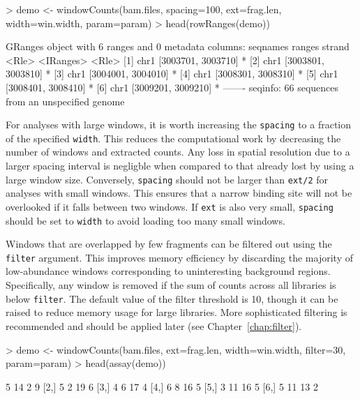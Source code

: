 \documentclass[12pt]{report}
\renewenvironment{Schunk}{\vspace{0pt}}{\vspace{0pt}}
\newcommand{\code}[1]{{\small\texttt{#1}}}
\begin{document}
\begin{Schunk}
\begin{Sinput}
> demo <- windowCounts(bam.files, spacing=100, ext=frag.len, width=win.width, param=param)
> head(rowRanges(demo))
\end{Sinput}
\begin{Soutput}
GRanges object with 6 ranges and 0 metadata columns:
      seqnames             ranges strand
         <Rle>          <IRanges>  <Rle>
  [1]     chr1 [3003701, 3003710]      *
  [2]     chr1 [3003801, 3003810]      *
  [3]     chr1 [3004001, 3004010]      *
  [4]     chr1 [3008301, 3008310]      *
  [5]     chr1 [3008401, 3008410]      *
  [6]     chr1 [3009201, 3009210]      *
  -------
  seqinfo: 66 sequences from an unspecified genome
\end{Soutput}
\end{Schunk}

For analyses with large windows, it is worth increasing the \code{spacing} to a fraction of the specified \code{width}. 
This reduces the computational work by decreasing the number of windows and extracted counts. 
Any loss in spatial resolution due to a larger spacing interval is negligble when compared to that already lost by using a large window size. 
Conversely, \code{spacing} should not be larger than \code{ext/2} for analyses with small windows.
This ensures that a narrow binding site will not be overlooked if it falls between two windows.
If \code{ext} is also very small, \code{spacing} should be set to \code{width} to avoid loading too many small windows.

Windows that are overlapped by few fragments can be filtered out using the \code{filter} argument. 
This improves memory efficiency by discarding the majority of low-abundance windows corresponding to uninteresting background regions. 
Specifically, any window is removed if the sum of counts across all libraries is below \code{filter}.
The default value of the filter threshold is 10, though it can be raised to reduce memory usage for large libraries.
More sophisticated filtering is recommended and should be applied later (see Chapter~\ref{chap:filter}).

\begin{Schunk}
\begin{Sinput}
> demo <- windowCounts(bam.files, ext=frag.len, width=win.width, filter=30, param=param)
> head(assay(demo))
\end{Sinput}
\begin{Soutput}
     [,1] [,2] [,3] [,4]
[1,]    5   14    2    9
[2,]    5    2   19    6
[3,]    4    6   17    4
[4,]    6    8   16    5
[5,]    3   11   16    5
[6,]    5   11   13    2
\end{Soutput}
\end{Schunk}
\end{document}
